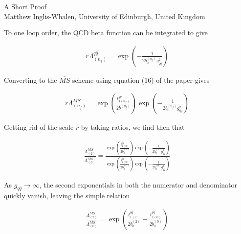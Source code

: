 \documentclass[10pt]{article}
\newcommand{\paren}[1]{ \left( {#1} \right) }
\begin{document}
\pagestyle{fancy}

\begin{center}
\Large{A Short Proof} \\
\vspace{0.7cm}
\large{Matthew Inglis-Whalen, University of Edinburgh, United Kingdom}
\end{center}

To one loop order, the QCD beta function can be integrated to give

\begin{equation} \label{eq:rLambda} \begin{aligned}
r\Lambda_{(n_f)}^{q\bar{q}} = \exp \paren{ -\frac{1}{2b_0^{(n_f)}g_{q\bar{q}}^2 } }
\end{aligned} \end{equation}

Converting to the $\overline{MS}$ scheme using equation (16) of the paper gives

\begin{equation} \label{eq:rLambdaMS} \begin{aligned}
r\Lambda_{(n_f)}^{\overline{MS}} = \exp \paren{\frac{ t_{1(n_f)}^{q\bar{q}}}{2b_0^{(n_f)}} } \exp \paren{ -\frac{1}{2b_0^{(n_f)}g_{q\bar{q}}^2 } }
\end{aligned} \end{equation}

Getting rid of the scale $r$ by taking ratios, we find then that

\begin{equation} \label{eq:LambdaMSrat} \begin{aligned}
\frac{\Lambda_{(2)}^{\overline{MS}}}{\Lambda_{(0)}^{\overline{MS}}} = \frac {\exp \paren{\frac{ t_{1(2)}^{q\bar{q}}}{2b_0^{(2)}} } \exp \paren{ -\frac{1}{2b_0^{(2)}g_{q\bar{q}}^2 } } } 
                                                                            {\exp \paren{\frac{ t_{1(0)}^{q\bar{q}}}{2b_0^{(0)}} } \exp \paren{ -\frac{1}{2b_0^{(0)}g_{q\bar{q}}^2 } } }
\end{aligned} \end{equation}

As $g_{q\bar{q}} \rightarrow \infty$, the second exponentials in both the numerator and denominator quickly vanish, leaving the simple relation

\begin{equation} \label{eq:LambdaMSratsimp} \begin{aligned}
\frac{\Lambda_{(2)}^{\overline{MS}}}{\Lambda_{(0)}^{\overline{MS}}} = \exp \paren{\frac{ t_{1(2)}^{q\bar{q}}}{2b_0^{(2)}} - \frac{ t_{1(0)}^{q\bar{q}}}{2b_0^{(0)}} } 
\end{aligned} \end{equation}
\end{document}
